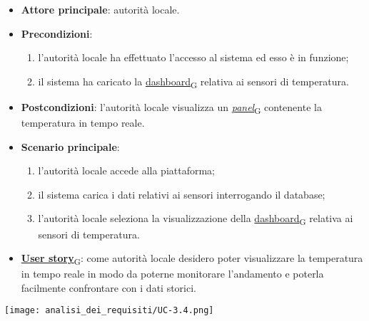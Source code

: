 \begin{itemize}
	\item \textbf{Attore principale}: autorità locale.
	\item \textbf{Precondizioni}:
	      \begin{enumerate}
		      \item l'autorità locale ha effettuato l'accesso al sistema ed esso è in funzione;
		      \item il sistema ha caricato la \href{https://7last.github.io/docs/pb/documentazione-interna/glossario\#dashboard}{dashboard\textsubscript{G}} relativa ai sensori di temperatura.
	      \end{enumerate}
	\item \textbf{Postcondizioni}: l'autorità locale visualizza un \href{https://7last.github.io/docs/pb/documentazione-interna/glossario\#panel}{\textit{panel}\textsubscript{G}} contenente la temperatura in tempo reale.
	\item \textbf{Scenario principale}:
	      \begin{enumerate}
		      \item l'autorità locale accede alla piattaforma;
		      \item il sistema carica i dati relativi ai sensori interrogando il database;
		      \item l'autorità locale seleziona la visualizzazione della \href{https://7last.github.io/docs/pb/documentazione-interna/glossario\#dashboard}{dashboard\textsubscript{G}} relativa ai sensori di temperatura.
	      \end{enumerate}
	\item \href{https://7last.github.io/docs/pb/documentazione-interna/glossario\#user-story}{\textbf{User story}\textsubscript{G}}:
	      come autorità locale desidero poter visualizzare la temperatura in tempo reale in modo da poterne monitorare l'andamento
	      e poterla facilmente confrontare con i dati storici.
\end{itemize}
\begin{center}
	\texttt{[image: analisi\_dei\_requisiti/UC-3.4.png]}
\end{center}


